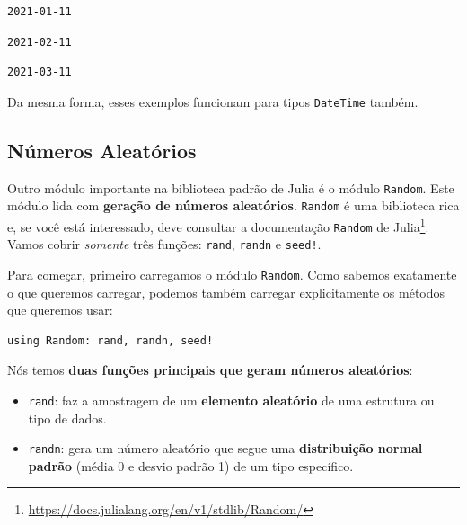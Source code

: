 \documentclass[
  notoc %
]{tufte-book}
\DeclareRobustCommand{\href}[2]{#2\footnote{\url{#1}}}
\providecommand{\tightlist}{%
  \setlength{\itemsep}{0pt}\setlength{\parskip}{0pt}
}
\newcommand{\passthrough}[1]{#1}
\begin{document}
\begin{lstlisting}[language=Output]
2021-01-11
\end{lstlisting}

\begin{lstlisting}[language=Output]
2021-02-11
\end{lstlisting}

\begin{lstlisting}[language=Output]
2021-03-11
\end{lstlisting}

Da mesma forma, esses exemplos funcionam para tipos
\passthrough{\lstinline!DateTime!} também.

\hypertarget{sec:random}{%
\subsection{Números Aleatórios}\label{sec:random}}

Outro módulo importante na biblioteca padrão de Julia é o módulo
\passthrough{\lstinline!Random!}. Este módulo lida com \textbf{geração
de números aleatórios}. \passthrough{\lstinline!Random!} é uma
biblioteca rica e, se você está interessado, deve consultar a
\href{https://docs.julialang.org/en/v1/stdlib/Random/}{documentação
\passthrough{\lstinline!Random!} de Julia}. Vamos cobrir \emph{somente}
três funções: \passthrough{\lstinline!rand!},
\passthrough{\lstinline!randn!} e \passthrough{\lstinline"seed!"}.

Para começar, primeiro carregamos o módulo
\passthrough{\lstinline!Random!}. Como sabemos exatamente o que queremos
carregar, podemos também carregar explicitamente os métodos que queremos
usar:

\begin{lstlisting}
using Random: rand, randn, seed!
\end{lstlisting}

Nós temos \textbf{duas funções principais que geram números aleatórios}:

\begin{itemize}
\tightlist
\item
  \passthrough{\lstinline!rand!}: faz a amostragem de um
  \textbf{elemento aleatório} de uma estrutura ou tipo de dados.
\item
  \passthrough{\lstinline!randn!}: gera um número aleatório que segue
  uma \textbf{distribuição normal padrão} (média 0 e desvio padrão 1) de
  um tipo específico.
\end{itemize}
\end{document}
